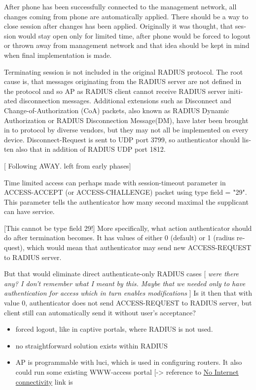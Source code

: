\documentclass[12pt,a4paper,english]{tutthesis}
\begin{document}
\begin{otherlanguage}{english}
After phone has been successfully connected to the management network,
all changes coming from 
phone are automatically applied. There should be a way to close
session after changes has been applied. Originally it was thought,
that session would stay open only for limited time, after phone would
be forced to logout or thrown away from management network and 
that idea should be kept in mind when final implementation is made.



Terminating session is not included in the original RADIUS protocol.
The root cause is, that 
messages originating from the RADIUS server are not
defined in the protocol and so AP as RADIUS client cannot receive
RADIUS server initiated disconnection messages. Additional extensions
such as Disconnect and Change-of-Authorization (CoA) packets, also
known as RADIUS Dynamic Authorization or RADIUS Disconnection
Message(DM),  have later been brought in\cite{rfc5176} to protocol by
diverse vendors, but they may not all be implemented on every device. 
Disconnect-Request is sent to UDP port 3799, so authenticator should
listen also that in addition of RADIUS UDP port 1812.






[ Following AWAY. left from early phases]

Time limited access can perhaps made with session-timeout parameter
in ACCESS-ACCEPT (or ACCESS-CHALLENGE) packet using type field = "29".
This parameter tells the authenticator how many second maximal the supplicant
can have service. 

[This cannot be type field 29!]  More specifically, what action
authenticator should do after termination becomes. It has values of
either 0 (default) or 1 (radius request), which would mean that
authenticator may send new ACCESS-REQUEST to RADIUS server.

But that would eliminate direct authenticate-only RADIUS cases
  [ \emph{were there}
 \emph{any? I don't remember what I meant}
 \emph{by this. Maybe that we needed only}
 \emph{to have authentication for access} 
 \emph{which in turn enables modifications} ]
Is it then that with value 0, authenticator does not send
ACCESS-REQUEST to RADIUS server, but client still can automatically send it without 
user's acceptance?
\begin{itemize}
\item forced logout, like in captive portals, where RADIUS is not used.
\item no straightforward solution exists within RADIUS
\item AP is programmable with luci, which is used in configuring routers. It also could run some existing WWW-access
portal [-> reference to \hyperref[text:nointernet]{No Internet connectivity} link is
\end{itemize}









\end{otherlanguage}
\end{document}
